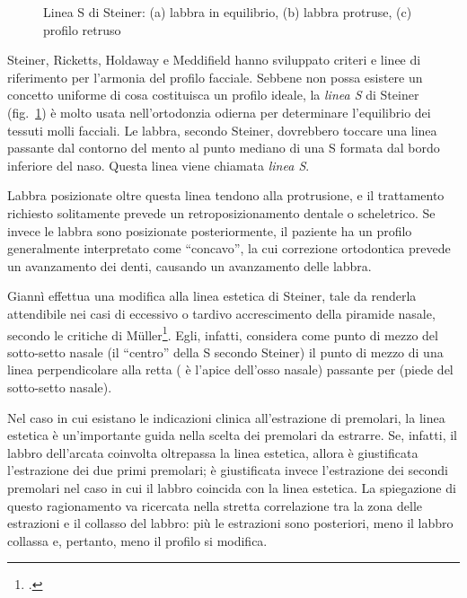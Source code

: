 \begin{figure}[!ht]
 \centering
 \caption{Linea S di Steiner: (a) labbra in equilibrio, (b) labbra protruse, (c) profilo retruso}
 \label{fig:steiner_linea_s}
\end{figure}

Steiner, Ricketts, Holdaway e Meddifield hanno sviluppato criteri e linee di riferimento per l'armonia del profilo facciale. Sebbene non possa esistere un concetto uniforme di cosa costituisca un profilo ideale, la \textit{linea S} di Steiner (fig.~\ref{fig:steiner_linea_s}) è molto usata nell'ortodonzia odierna per determinare l'equilibrio dei tessuti molli facciali. Le labbra, secondo Steiner, dovrebbero toccare una linea passante dal contorno del mento al punto mediano di una S formata dal bordo inferiore del naso. Questa linea viene chiamata \textit{linea S}.

Labbra posizionate oltre questa linea tendono alla protrusione, e il trattamento richiesto solitamente prevede un retroposizionamento dentale o scheletrico. Se invece le labbra sono posizionate posteriormente, il paziente ha un profilo generalmente interpretato come ``concavo'', la cui correzione ortodontica prevede un avanzamento dei denti, causando un avanzamento delle labbra.

Giannì effettua una modifica alla linea estetica di Steiner, tale da renderla attendibile nei casi di eccessivo o tardivo accrescimento della piramide nasale, secondo le critiche di Müller\footcite{Mueller1969}. Egli, infatti, considera come punto di mezzo del sotto-setto nasale (il ``centro'' della S secondo Steiner) il punto di mezzo di una linea perpendicolare alla retta  ( è l'apice dell'osso nasale) passante per  (piede del sotto-setto nasale).

Nel caso in cui esistano le indicazioni clinica all'estrazione di premolari, la linea estetica è un'importante guida nella scelta dei premolari da estrarre. Se, infatti, il labbro dell'arcata coinvolta oltrepassa la linea estetica, allora è giustificata l'estrazione dei due primi premolari; è giustificata invece l'estrazione dei secondi premolari nel caso in cui il labbro coincida con la linea estetica. La spiegazione di questo ragionamento va ricercata nella stretta correlazione tra la zona delle estrazioni e il collasso del labbro: più le estrazioni sono posteriori, meno il labbro collassa e, pertanto, meno il profilo si modifica.
